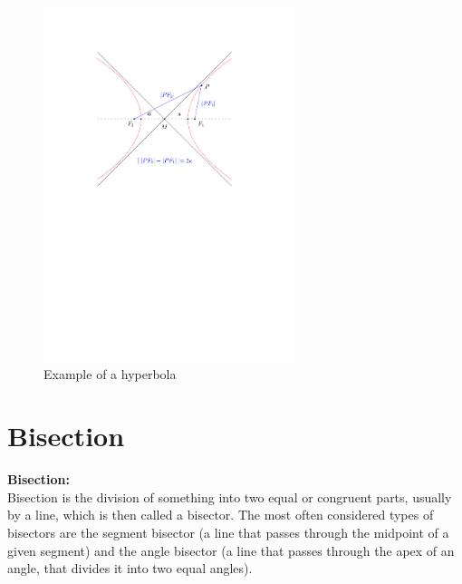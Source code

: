 \begin{figure}[H] 
	\centering
	\includegraphics[width=0.65\textwidth]{figures/hyperbola.pdf} 
	\caption{Example of a hyperbola} 
	\label{fig:hyperbola} 
\end{figure}

\newpage

\section{Bisection}

\begin{mydef}
	\textbf{Bisection:} \\ 
	Bisection is the division of something into
	two equal or congruent parts, usually by a line, which is then called a
	bisector. The most often considered types of bisectors are the segment
	bisector (a line that passes through the midpoint of a given segment) and
	the angle bisector (a line that passes through the apex of an angle, that
	divides it into two equal angles).\cite{Bisector-collinearity-convexPoly}
\end{mydef}

